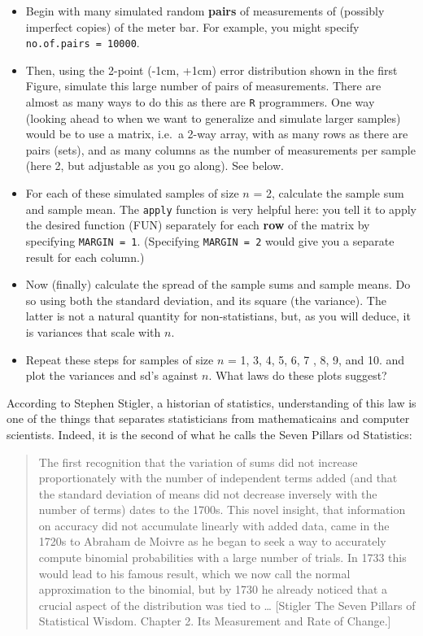 \documentclass[]{book}
\begin{document}
\begin{enumerate}
  \begin{itemize}
  \item
    Begin with many simulated random \textbf{pairs} of measurements of (possibly imperfect copies) of the meter bar. For example, you might specify \texttt{no.of.pairs\ =\ 10000}.
  \item
    Then, using the 2-point (-1cm, +1cm) error distribution shown in the first Figure, simulate this large number of pairs of measurements. There are almost as many ways to do this as there are \texttt{R} programmers. One way (looking ahead to when we want to generalize and simulate larger samples) would be to use a matrix, i.e.~a 2-way array, with as many rows as there are pairs (sets), and as many columns as the number of measurements per sample (here 2, but adjustable as you go along). See below.
  \item
    For each of these simulated samples of size \(n\) = 2, calculate the sample sum and sample mean. The \texttt{apply} function is very helpful here: you tell it to apply the desired function (FUN) separately for each \textbf{row} of the matrix by specifying \texttt{MARGIN\ =\ 1}. (Specifying \texttt{MARGIN\ =\ 2} would give you a separate result for each column.)
  \item
    Now (finally) calculate the spread of the sample sums and sample means. Do so using both the standard deviation, and its square (the variance). The latter is not a natural quantity for non-statistians, but, as you will deduce, it is variances that scale with \(n\).
  \item
    Repeat these steps for samples of size \(n\) = 1, 3, 4, 5, 6, 7 , 8, 9, and 10. and plot the variances and sd's against \(n.\) What laws do these plots suggest?
  \end{itemize}
\end{enumerate}

According to Stephen Stigler, a historian of statistics, understanding of this law is one of the things that separates statisticians from mathematicains and computer scientists. Indeed, it is the second of what he calls the Seven Pillars od Statistics:

\begin{quote}
The first recognition that the variation of sums did not increase proportionately with the number of independent terms added (and that the standard deviation of means did not decrease inversely with the number of terms) dates to the 1700s. This novel insight, that information on accuracy did not accumulate linearly with added data, came in the 1720s to Abraham de Moivre as he began to seek a way to accurately compute binomial probabilities with a large number of trials. In 1733 this would lead to his famous result, which we now call the normal approximation to the binomial, but by 1730 he already noticed that a crucial aspect of the distribution was tied to \ldots{} {[}Stigler The Seven Pillars of Statistical Wisdom. Chapter 2. Its Measurement and Rate of Change.{]}
\end{quote}
\end{document}
